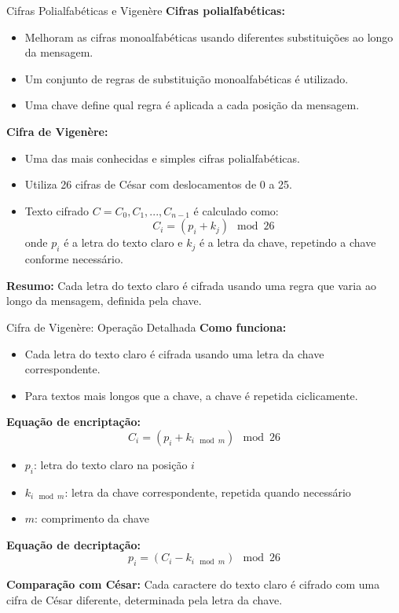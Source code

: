 \begin{frame}{Cifras Polialfabéticas e Vigenère}
    \textbf{Cifras polialfabéticas:}
    \begin{itemize}
        \item Melhoram as cifras monoalfabéticas usando diferentes substituições ao longo da mensagem.
        \item Um conjunto de regras de substituição monoalfabéticas é utilizado.
        \item Uma chave define qual regra é aplicada a cada posição da mensagem.
    \end{itemize}

    \textbf{Cifra de Vigenère:}
    \begin{itemize}
        \item Uma das mais conhecidas e simples cifras polialfabéticas.
        \item Utiliza 26 cifras de César com deslocamentos de 0 a 25.
        \item Texto cifrado $C = C_0, C_1, ..., C_{n-1}$ é calculado como:
              \[
                  C_i = (p_i + k_j) \mod 26
              \]
              onde $p_i$ é a letra do texto claro e $k_j$ é a letra da chave, repetindo a chave conforme necessário.
    \end{itemize}

    \textbf{Resumo:}
    Cada letra do texto claro é cifrada usando uma regra que varia ao longo da mensagem, definida pela chave.
\end{frame}

\begin{frame}{Cifra de Vigenère: Operação Detalhada}
    \textbf{Como funciona:}
    \begin{itemize}
        \item Cada letra do texto claro é cifrada usando uma letra da chave correspondente.
        \item Para textos mais longos que a chave, a chave é repetida ciclicamente.
    \end{itemize}

    \textbf{Equação de encriptação:}
    \[
        C_i = (p_i + k_{i \mod m}) \mod 26
    \]
    \begin{itemize}
        \item $p_i$: letra do texto claro na posição $i$
        \item $k_{i \mod m}$: letra da chave correspondente, repetida quando necessário
        \item $m$: comprimento da chave
    \end{itemize}

    \textbf{Equação de decriptação:}
    \[
        p_i = (C_i - k_{i \mod m}) \mod 26
    \]

    \textbf{Comparação com César:}
    Cada caractere do texto claro é cifrado com uma cifra de César diferente, determinada pela letra da chave.

\end{frame}

